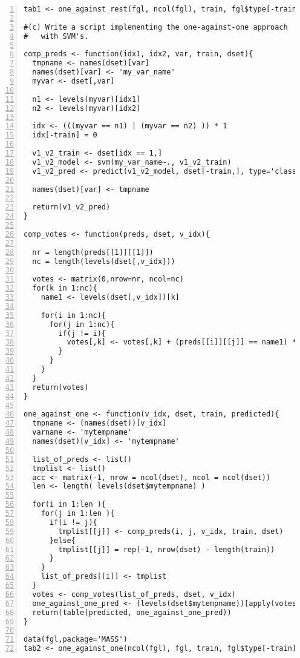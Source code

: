 \documentclass[11pt]{article}
\begin{document}
\begin{Verbatim}[numbers=left]
tab1 <- one_against_rest(fgl, ncol(fgl), train, fgl$type[-train])

#(c) Write a script implementing the one-against-one approach 
#   with SVM's.

comp_preds <- function(idx1, idx2, var, train, dset){
  tmpname <- names(dset)[var]
  names(dset)[var] <- 'my_var_name'
  myvar <- dset[,var]

  n1 <- levels(myvar)[idx1]
  n2 <- levels(myvar)[idx2]

  idx <- (((myvar == n1) | (myvar == n2) )) * 1
  idx[-train] = 0

  v1_v2_train <- dset[idx == 1,]
  v1_v2_model <- svm(my_var_name~., v1_v2_train)
  v1_v2_pred <- predict(v1_v2_model, dset[-train,], type='class')

  names(dset)[var] <- tmpname

  return(v1_v2_pred)
}

comp_votes <- function(preds, dset, v_idx){

  nr = length(preds[[1]][[1]])
  nc = length(levels(dset[,v_idx]))

  votes <- matrix(0,nrow=nr, ncol=nc)
  for(k in 1:nc){
    name1 <- levels(dset[,v_idx])[k]

    for(i in 1:nc){
      for(j in 1:nc){
        if(j != i){
          votes[,k] <- votes[,k] + (preds[[i]][[j]] == name1) * 1
        }
      }
    }
  }
  return(votes)
}

one_against_one <- function(v_idx, dset, train, predicted){
  tmpname <- (names(dset))[v_idx]
  varname <- 'mytempname'
  names(dset)[v_idx] <- 'mytempname'

  list_of_preds <- list()
  tmplist <- list()
  acc <- matrix(-1, nrow = ncol(dset), ncol = ncol(dset))
  len <- length( levels(dset$mytempname) )

  for(i in 1:len ){
    for(j in 1:len ){
      if(i != j){
        tmplist[[j]] <- comp_preds(i, j, v_idx, train, dset)
      }else{
      	tmplist[[j]] = rep(-1, nrow(dset) - length(train))
      }
    }
    list_of_preds[[i]] <- tmplist
  }
  votes <- comp_votes(list_of_preds, dset, v_idx)
  one_against_one_pred <- (levels(dset$mytempname))[apply(votes,1,which.max)]
  return(table(predicted, one_against_one_pred))
}

data(fgl,package='MASS')
tab2 <- one_against_one(ncol(fgl), fgl, train, fgl$type[-train])
\end{Verbatim}
\end{document}
